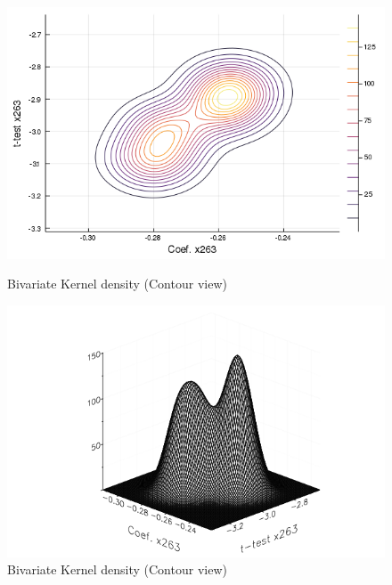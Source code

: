 \documentclass{article}
\begin{document}
\begin{figure}[!ht]
  \centering
  \begin{minipage}[b]{0.46\textwidth}
    \centering
    \includegraphics[width=\textwidth]{contour_x263_b_t.png}
    \caption{Bivariate Kernel density (Contour view)}
  \end{minipage}
  \hfill
  \begin{minipage}[b]{0.53\textwidth}
    \centering
    \includegraphics[width=\textwidth]{wireframe_x263_b_t.png}
    \caption{Bivariate Kernel density (Contour view)}
  \end{minipage}


\end{figure}
\end{document}
